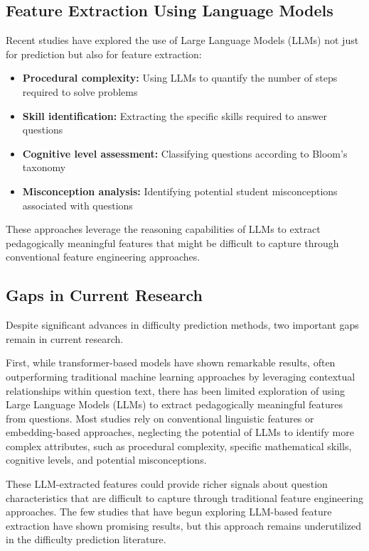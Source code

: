 \documentclass[
    a4paper, %
    10pt, %
    twoside, %
]{LTJournalArticle}
\begin{document}
\subsection{Feature Extraction Using Language Models}

Recent studies have explored the use of Large Language Models (LLMs) not just for prediction but also for feature extraction:

\begin{itemize}
    \item \textbf{Procedural complexity:} Using LLMs to quantify the number of steps required to solve problems \textcite{liu2023improving}
    \item \textbf{Skill identification:} Extracting the specific skills required to answer questions \textcite{didolkar2024metacognitive}
    \item \textbf{Cognitive level assessment:} Classifying questions according to Bloom's taxonomy \textcite{scaria2024automated}
    \item \textbf{Misconception analysis:} Identifying potential student misconceptions associated with questions \textcite{sadihin2024proposalml}
\end{itemize}

These approaches leverage the reasoning capabilities of LLMs to extract pedagogically meaningful features that might be difficult to capture through conventional feature engineering approaches.

\subsection{Gaps in Current Research}

Despite significant advances in difficulty prediction methods, two important gaps remain in current research.

First, while transformer-based models have shown remarkable results, often outperforming traditional machine learning approaches by leveraging contextual relationships within question text, there has been limited exploration of using Large Language Models (LLMs) to extract pedagogically meaningful features from questions. Most studies rely on conventional linguistic features or embedding-based approaches, neglecting the potential of LLMs to identify more complex attributes, such as procedural complexity, specific mathematical skills, cognitive levels, and potential misconceptions.

These LLM-extracted features could provide richer signals about question characteristics that are difficult to capture through traditional feature engineering approaches. The few studies that have begun exploring LLM-based feature extraction have shown promising results, but this approach remains underutilized in the difficulty prediction literature.
\end{document}
